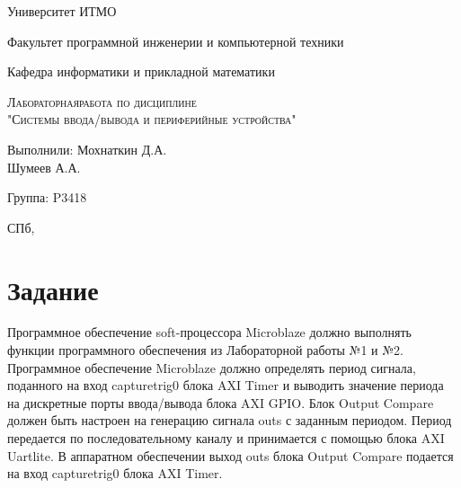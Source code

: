 \documentclass[a4paper, 12pt]{article}
\newif\ifisinsp
\newif\ifisone
\newif\ifisname
\newif\ifisnum
\def \labtype {Лабораторная}
\def \labnum {3}
\def \labsubj {Системы ввода/вывода и периферийные устройства}
\def \labauthor {Мохнаткин Д.А. \\ Шумеев А.А.}
\def \labgroup {P3418}
\def \labinsp {Быковский С.В.}
\def \labname {Вариант 5}
\begin{document}
\begin{titlepage}
	\begin{center}
		\large
		Университет ИТМО

		\vspace{0.25cm}
		
		Факультет программной инженерии и компьютерной техники
		
		Кафедра информатики и прикладной математики
		\vfill
		
		\textsc{\labtype\space работа \ifisnum № \labnum{} \fi по дисциплине \\"\labsubj" \ifisname\small \\ \labname \fi}
			
		\bigskip
	\end{center}
	\vfill
	\vfill
	
	\begin{flushright}
	\ifisone
	Выполнил: \labauthor
	\else
	Выполнили: \labauthor
	\fi

	\vspace{0.25cm}
	Группа: \labgroup
			
	\vspace{0.25cm}
	\ifisinsp
	Проверяющий: \labinsp
	\fi
	\end{flushright}
	\vfill
	
	\begin{center}
	СПб, \the\year
	\end{center}
\end{titlepage}

\tableofcontents

\newpage
\section{Задание}
Программное обеспечение soft-процессора Microblaze должно выполнять функции программного обеспечения из Лабораторной работы №1 и №2.
Программное обеспечение Microblaze должно определять период сигнала, поданного на вход capturetrig0 блока AXI Timer и выводить значение периода на дискретные порты ввода/вывода блока AXI GPIO.
Блок Output Compare должен быть настроен на генерацию сигнала outs с заданным периодом. Период передается по последовательному каналу и принимается с помощью блока AXI Uartlite.
В аппаратном обеспечении выход outs блока Output Compare подается на вход capturetrig0 блока AXI Timer.
\end{document}
